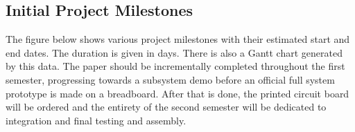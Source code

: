 \subsection{Initial Project Milestones}

The figure below shows various project milestones with their estimated start and end dates. The duration is given in days. There is also a Gantt chart generated by this data. The paper should be incrementally completed throughout the first semester, progressing towards a subsystem demo before an official full system prototype is made on a breadboard. After that is done, the printed circuit board will be ordered and the entirety of the second semester will be dedicated to integration and final testing and assembly. 